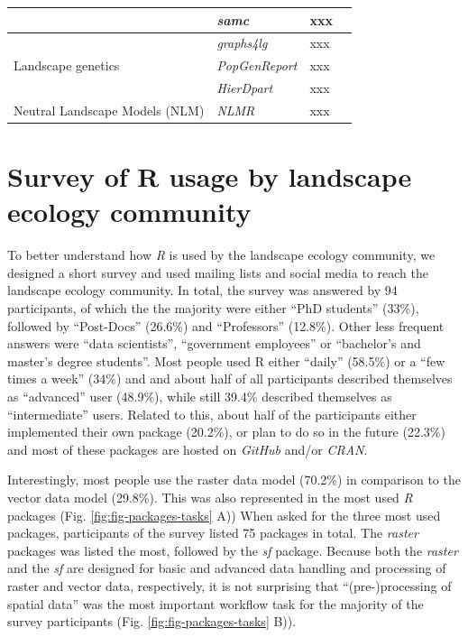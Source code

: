 \documentclass[smallextended]{svjour3}       %
\begin{document}
\begin{landscape}
\begin{table}
\begin{tabularx}{0.9\linewidth}{XXXX}
      & \textit{samc} & xxx & \cite{Marx2020} \\
      \hline
      \multirow{3}{*}{Landscape genetics} & \textit{graphs4lg} & xxx & \cite{Savary2020} \\
      & \textit{PopGenReport} & xxx & \cite{Adamack2014,Gruber2015} \\
      & \textit{HierDpart} & xxx & \cite{Qin2019} \\
      \hline
      Neutral Landscape Models (NLM) & \textit{NLMR} & xxx & \cite{Sciaini2018} \\
      \hline
    \end{tabularx}
  \end{table}

\end{landscape}

\hypertarget{survey-of-r-usage-by-landscape-ecology-community}{%
\section{Survey of R usage by landscape ecology community}\label{survey-of-r-usage-by-landscape-ecology-community}}

To better understand how \emph{R} is used by the landscape ecology community, we designed a short survey and used mailing lists and social media to reach the landscape ecology community.
In total, the survey was answered by 94 participants, of which the the majority were either ``PhD students'' (33\%), followed by ``Post-Docs'' (26.6\%) and ``Professors'' (12.8\%). Other less frequent answers were ``data scientists'', ``government employees'' or ``bachelor's and master's degree students''.
Most people used R either ``daily'' (58.5\%) or a ``few times a week'' (34\%) and and about half of all participants described themselves as ``advanced'' user (48.9\%), while still 39.4\% described themselves as ``intermediate'' users.
Related to this, about half of the participants either implemented their own package (20.2\%), or plan to do so in the future (22.3\%) and most of these packages are hosted on \emph{GitHub} and/or \emph{CRAN}.

Interestingly, most people use the raster data model (70.2\%) in comparison to the vector data model (29.8\%).
This was also represented in the most used \emph{R} packages (Fig. \ref{fig:fig-packages-tasks} A))
When asked for the three most used packages, participants of the survey listed 75 packages in total. The \emph{raster} packages was listed the most, followed by the \emph{sf} package.
Because both the \emph{raster} and the \emph{sf} are designed for basic and advanced data handling and processing of raster and vector data, respectively, it is not surprising that ``(pre-)processing of spatial data'' was the most important workflow task for the majority of the survey participants (Fig. \ref{fig:fig-packages-tasks} B)).
\end{document}
